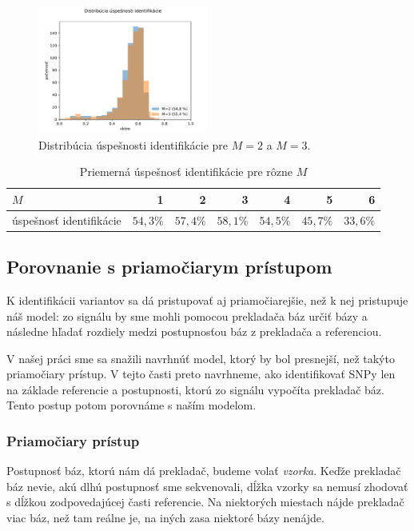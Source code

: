 \begin{figure}[t]
\centerline{\includegraphics[width=0.5\textwidth]{plots/4_uspesnost_1az2}}
\caption{Distribúcia úspešnosti identifikácie pre $M = 2$ a $M = 3$.}
\label{fig:uspesnost_M}
\end{figure}

\begin{table}[t]
\centering
\caption{Priemerná úspešnosť identifikácie pre rôzne $M$}
\label{my-label}
\begin{tabular}{lrrrrrr}
\hline
$M$                       & 1         & 2         & 3         & 4         & 5         & 6         \\ \hline
úspešnosť identifikácie & $54,3 \%$ & $57,4 \%$ & $58,1 \%$ & $54,5 \%$ & $45,7 \%$ & $33,6 \%$ \\ \hline
\end{tabular}
\label{tab:uspesnost_M}
\end{table}


\subsection{Porovnanie s priamočiarym prístupom}

K identifikácii variantov sa dá pristupovať aj priamočiarejšie, než k nej pristupuje náš model:
zo signálu by sme mohli pomocou prekladača báz určiť bázy a následne hľadať rozdiely medzi postupnosťou
báz z prekladača a referenciou.

V našej práci sme sa snažili navrhnúť model, ktorý by bol presnejší, než takýto priamočiary
prístup. V tejto časti preto navrhneme, ako identifikovať SNPy len na základe referencie a postupnosti,
ktorú zo signálu vypočíta prekladač báz. Tento postup potom porovnáme s naším modelom.

\subsubsection{Priamočiary prístup}

Postupnosť báz, ktorú nám dá prekladač, budeme volať \emph{vzorka}. Keďže prekladač báz nevie,
akú dlhú postupnosť sme sekvenovali, dĺžka vzorky sa nemusí zhodovať s dĺžkou 
zodpovedajúcej časti referencie.
Na niektorých miestach nájde prekladač viac báz, než tam reálne je, na iných zasa niektoré
bázy nenájde.

